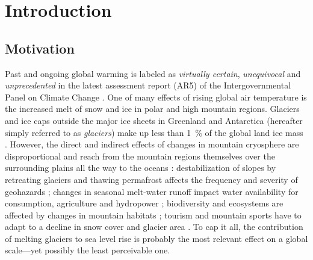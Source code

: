 \chapter{Introduction}\label{chap:introduction}
\thispagestyle{plain}

\section{Motivation} %
\label{sec:motivation}


    Past and ongoing global warming is labeled as \emph{virtually certain}, \emph{unequivocal} and \emph{unprecedented} in the latest assessment report (AR5) of the Intergovernmental Panel on Climate Change \citep{IPCC2013}. 
    One of many effects of rising global air temperature is the increased melt of snow and ice in polar and high mountain regions. Glaciers and ice caps outside the major ice sheets in Greenland and Antarctica (hereafter simply referred to as \emph{glaciers}) make up less than \SI{1}{\percent} of the global land ice mass \citep[cf.][]{Farinotti2019, Vaughan2013}. However, the direct and indirect effects of changes in mountain cryosphere are disproportional and reach from the mountain regions themselves over the surrounding plains all the way to the oceans \citep{IPCC2019_TS}: destabilization of slopes by retreating glaciers and thawing permafrost affects the frequency and severity of geohazards \citep[e.g.,][]{Richardson2000, Deline2015, Haeberli2017}; changes in seasonal melt-water runoff impact water availability for consumption, agriculture and hydropower \citep[e.g.,][]{Farinotti2016,Huss2018, Ali2018, Immerzeel2020}; biodiversity and ecosystems are affected by changes in mountain habitats \citep[e.g.,][]{Milner2017}; tourism and mountain sports have to adapt to a decline in snow cover and glacier area \citep[e.g.,][]{Stewart2016, Lemieux2018, Mourey2019}. To cap it all, the contribution of melting glaciers to sea level rise is probably the most relevant effect on a global scale---yet possibly the least perceivable one.

